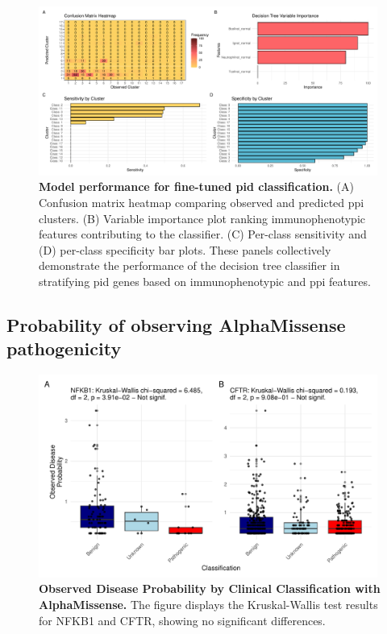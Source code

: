 \begin{figure}[ht]
  \centering
  \includegraphics[width=0.99\textwidth]{../images/plot_combined_model_interpret_fine.pdf}
  \caption{\textbf{Model performance for fine-tuned \ac{pid} classification.} (A) Confusion matrix heatmap comparing observed and predicted \ac{ppi} clusters. (B) Variable importance plot ranking immunophenotypic features contributing to the classifier. (C) Per-class sensitivity and (D) per-class specificity bar plots. These panels collectively demonstrate the performance of the decision tree classifier in stratifying \ac{pid} genes based on immunophenotypic and \ac{ppi} features.}
  
  \label{fig:confusion_matrix}
\end{figure}

\FloatBarrier
\subsection{Probability of observing AlphaMissense pathogenicity}

\begin{figure}[ht]
  \centering
  \includegraphics[width=0.99\textwidth]{../images/p_alphamissense_kw.pdf}
  \caption{\textbf{Observed Disease Probability by Clinical Classification with AlphaMissense.} The figure displays the Kruskal-Wallis test results for NFKB1 and CFTR, showing no significant differences.}
  \label{fig:alphamissense_kw}
\end{figure}

